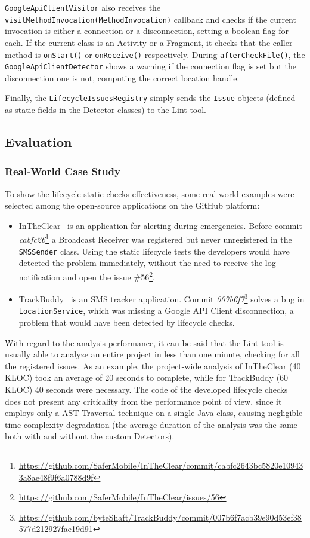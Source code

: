 \documentclass[11pt,a4paper,notitlepage]{article}
\begin{document}
\texttt{GoogleApiClientVisitor} also receives the \texttt{visitMethodInvocation(MethodInvocation)} callback and checks if the current invocation is either a connection or a disconnection, setting a boolean flag for each. If the current class is an Activity or a Fragment, it checks that the caller method is \texttt{onStart()} or \texttt{onReceive()} respectively. During \texttt{afterCheckFile()}, the \texttt{GoogleApiClientDetector} shows a warning if the connection flag is set but the disconnection one is not, computing the correct location handle.

Finally, the \texttt{LifecycleIssuesRegistry} simply sends the \texttt{Issue} objects (defined as static fields in the Detector classes) to the Lint tool.

\subsection{Evaluation}

\subsubsection{Real-World Case Study}
To show the lifecycle static checks effectiveness, some real-world examples were selected among the open-source applications on the GitHub platform:
\begin{itemize}
	\item InTheClear~\cite{InTheClear} is an application for alerting during emergencies. Before commit \textit{cabfc26}\footnote{\url{https://github.com/SaferMobile/InTheClear/commit/cabfc2643bc5820e109433a8ae48f9f6a0788d9f}} a Broadcast Receiver was registered but never unregistered in the \texttt{SMSSender} class. Using the static lifecycle tests the developers would have detected the problem immediately, without the need to receive the log notification and open the issue \#56\footnote{\url{https://github.com/SaferMobile/InTheClear/issues/56}}.
	\item TrackBuddy~\cite{TrackBuddy} is an SMS tracker application. Commit \textit{007b6f7}\footnote{\url{https://github.com/byteShaft/TrackBuddy/commit/007b6f7acb39e90d53ef38577d212927fae19d91}} solves a bug in \texttt{LocationService}, which was missing a Google API Client disconnection, a problem that would have been detected by lifecycle checks.
\end{itemize}

With regard to the analysis performance, it can be said that the Lint tool is usually able to analyze an entire project in less than one minute, checking for all the registered issues. As an example, the project-wide analysis of InTheClear (40 KLOC) took an average of 20 seconds to complete, while for TrackBuddy (60 KLOC) 40 seconds were necessary. The code of the developed lifecycle checks does not present any criticality from the performance point of view, since it employs only a AST Traversal technique on a single Java class, causing negligible time complexity degradation (the average duration of the analysis was the same both with and without the custom Detectors).
\end{document}

